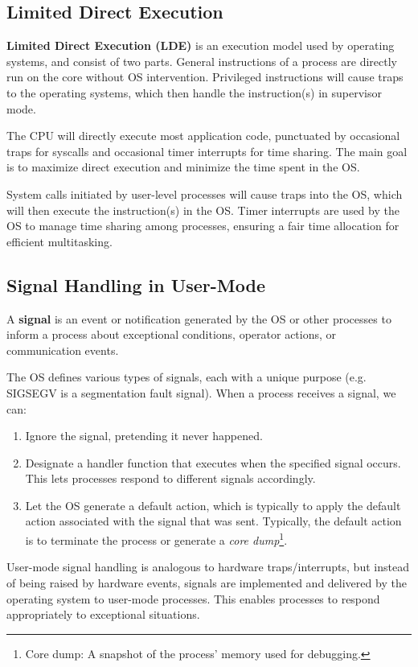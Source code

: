 \documentclass{report}
\newcommand{\definitionBegin}[1]{\begin{tcolorbox}[title={Definition: #1}]}
\newcommand{\definitionEnd}{\end{tcolorbox}}
\begin{document}
\subsection{Limited Direct Execution}
\label{subsec:LDE}
\definitionBegin{Limited Direct Execution (LDE)}
\textbf{Limited Direct Execution (LDE)} is an execution model used by operating systems, and consist
of two parts. General instructions of a process are directly run on the core without OS
intervention. Privileged instructions will cause traps to the operating systems, which then handle
the instruction(s) in supervisor mode.
\definitionEnd

The CPU will directly execute most application code, punctuated by occasional traps for syscalls and
occasional timer interrupts for time sharing. The main goal is to maximize direct execution and
minimize the time spent in the OS.

System calls initiated by user-level processes will cause traps into the OS, which will then execute
the instruction(s) in the OS. Timer interrupts are used by the OS to manage time sharing among
processes, ensuring a fair time allocation for efficient multitasking.


\subsection{Signal Handling in User-Mode}
\definitionBegin{Signal}
A \textbf{signal} is an event or notification generated by the OS or other processes to inform a
process about exceptional conditions, operator actions, or communication events.
\definitionEnd

The OS defines various types of signals, each with a unique purpose (e.g. SIGSEGV is a segmentation
fault signal). When a process receives a signal, we can:
\begin{enumerate}[label=\textit{(\roman*)}]
\item Ignore the signal, pretending it never happened.
\item Designate a handler function that executes when the specified signal occurs. This lets
  processes respond to different signals accordingly.
\item Let the OS generate a default action, which is typically to apply the default action associated
  with the signal that was sent. Typically, the default action is to terminate the process or
  generate a \textit{core dump}\footnote{Core dump: A snapshot of the process' memory used for
    debugging.}. 
\end{enumerate}
User-mode signal handling is analogous to hardware traps/interrupts, but instead of being raised by
hardware events, signals are implemented and delivered by the operating system to user-mode
processes. This enables processes to respond appropriately to exceptional situations.
\end{document}
